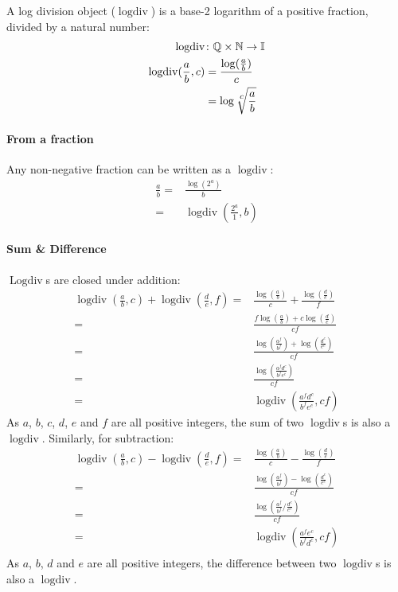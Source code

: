 \documentclass{book}
\DeclareMathOperator{\logdiv}{logdiv}
\DeclareMathOperator{\Logdiv}{Logdiv}
\begin{document}
            A log division object ($\logdiv$) is a base-2 logarithm of a positive fraction, divided by a natural number:
            \begin{align*}
                \logdiv &{}\colon \mathbb{Q} \times \mathbb{N} \rightarrow \mathbb{I}\\
                \logdiv(\frac{a}{b}, c) &{}= \frac{\log(\frac{a}{b})}{c}\\
                &{}= \log \sqrt[\leftroot{-1}\uproot{2}\scriptstyle c]{\frac{a}{b}}
            \end{align*}

            \paragraph*{From a fraction}
                Any non-negative fraction can be written as a $\logdiv$:
                \begin{align*}
                    \frac{a}{b} ={}& \frac{\log(2^a)}{b} \\
                    {}={}& \logdiv(\frac{2^a}{1}, b)
                \end{align*}
    
            \paragraph*{Sum \& Difference}
                $\Logdiv$s are closed under addition:
                \begin{align*}
                    \logdiv(\frac{a}{b}, c) + \logdiv(\frac{d}{e}, f) = {}& 
                    \frac{\log(\frac{a}{b})}{c} + \frac{\log(\frac{d}{e})}{f}\\
                    {}={}& \frac{f\log(\frac{a}{b}) + c\log(\frac{d}{e})}{cf}\\
                    {}={}& \frac{\log(\frac{a^f}{b^f}) + \log(\frac{d^c}{e^c})}{cf}\\
                    {}={}& \frac{\log(\frac{a^f d^c}{b^f e^c})}{cf}\\
                    {}={}& \logdiv(\frac{a^f d^c}{b^f e^c}, cf)
                \end{align*}
                As $a$, $b$, $c$, $d$, $e$ and $f$ are all positive integers, the sum of two $\logdiv$s is also a $\logdiv$.
                Similarly, for subtraction:
                \begin{align*}
                    \logdiv(\frac{a}{b}, c) - \logdiv(\frac{d}{e}, f) = {}& 
                    \frac{\log(\frac{a}{b})}{c} - \frac{\log(\frac{d}{e})}{f}\\
                    {}={}& \frac{\log(\frac{a^f}{b^f}) - \log(\frac{d^c}{e^c})}{cf}\\
                    {}={}& \frac{\log(\frac{a^f}{b^f} / \frac{d^c}{e^c})}{cf}\\
                    {}={}& \logdiv(\frac{a^f e^c}{b^f d^c}, cf)\\
                \end{align*}
                As $a$, $b$, $d$ and $e$ are all positive integers, the difference between two $\logdiv$s is also a $\logdiv$.
\end{document}
